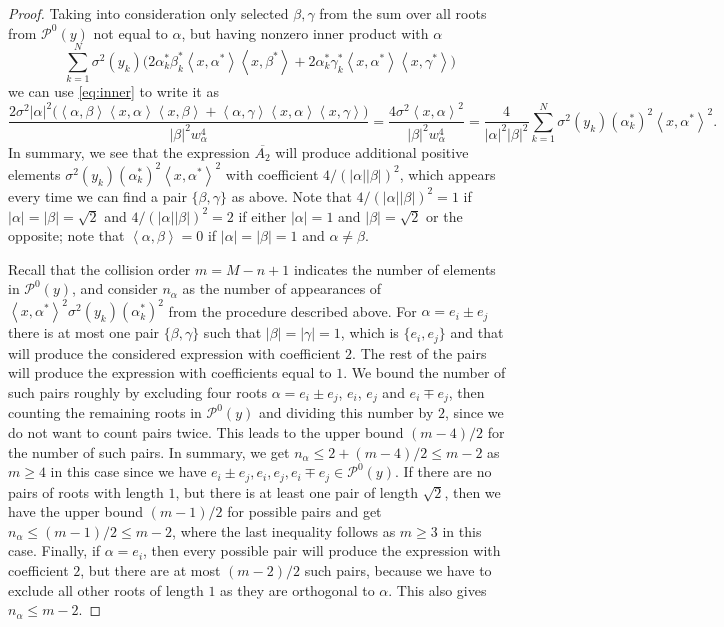 \documentclass{article}
\numberwithin{equation}{section}
\newcommand{\xa}{\left<x,\alpha\right>}
\newcommand{\xb}{\left<x,\beta\right>}
\newcommand{\xc}{\left<x,\gamma\right>}
\newcommand{\xas}{\left<x,\alpha^*\right>}
\newcommand{\xbs}{\left<x,\beta^*\right>}
\newcommand{\xcs}{\left<x,\gamma^*\right>}
\newcommand{\ab}{\left<\alpha,\beta\right>}
\newcommand{\ac}{\left<\alpha,\gamma\right>}
\newcommand{\Pzero}{\mathcal{P}^0(y)}
\theoremstyle{plain}
\begin{document}
\begin{proof}
Taking into consideration only selected $\beta,\gamma$ from the sum over all roots from $\Pzero$ not equal to $\alpha$, but having nonzero inner product with $\alpha$
\begin{equation*}
    \sum_{k=1}^N \sigma^2(y_k) \big(2\alpha_k^*\beta_k^* \xas\xbs+2\alpha_k^*\gamma_k^*\xas\xcs\big)
\end{equation*}
we can use \eqref{eq:inner} to write it as
\begin{equation*}
    \frac{2\sigma^2|\alpha|^2\big(\ab \xa\xb+	\ac \xa\xc\big)}{|\beta|^2 w_\alpha^4 } = \frac{4\sigma^2\xa^2}{|\beta|^2 w_\alpha^4} = \frac{4}{|\alpha|^2|\beta|^2 }\sum_{k=1}^N \sigma^2(y_k)(\alpha_k^*)^2 \xas^2.
\end{equation*}
In summary, we see that the expression $\overline{A_2}$ will produce additional positive elements $\sigma^2(y_k)(\alpha_k^*)^2\xas^2$ with coefficient $4/(|\alpha||\beta|)^2$, which appears every time we can find a pair $\{\beta,\gamma\}$ as above. Note that $4/(|\alpha||\beta|)^2=1$ if $|\alpha|=|\beta|=\sqrt{2}$ and $4/(|\alpha||\beta|)^2={2}$ {if either $|\alpha|=1$ and $|\beta|=\sqrt2$ or the opposite; note that $\ab=0$ if $|\alpha|=|\beta|=1$ and $\alpha\neq\beta$.}

Recall that the collision order $m=M-n+1$ indicates the number of elements in $\Pzero$, and consider $n_\alpha$ as the number of appearances of $\xas^2\sigma^2(y_k)(\alpha_k^*)^2$ from the procedure described above. For $\alpha = e_i\pm e_j$ there is at most one pair $\{\beta,\gamma\}$ such that $|\beta|=|\gamma|=1$, which is $\{e_i,e_j\}$ and that will produce the considered expression with coefficient $2$. The rest of the pairs will produce the expression with coefficients equal to $1$. We bound the number of such pairs roughly by excluding four roots $\alpha = e_i\pm e_j$, $e_i$, $e_j$ and $e_i\mp e_j$, then counting the remaining roots in $\Pzero$ and dividing this number by $2$, since we do not want to count pairs twice. This leads to the upper bound $(m-4)/2$ for the number of such pairs. In summary, we get $n_\alpha\leq 2+(m-4)/2\leq m-2$ as $m\geq 4$ in this case since we have $e_i\pm e_j, e_i, e_j, e_i\mp e_j \in \Pzero$. If there are no pairs of roots with length $1$, but there is at least one pair of length $\sqrt{2}$, then we have the upper bound $(m-1)/2$ for possible pairs and get $n_\alpha\leq (m-1)/2\leq m-2$, where the last inequality follows as $m\geq 3$ in this case. Finally, if $\alpha=e_i$, then every possible pair will produce the expression with coefficient $2$, but there are at most $(m-2)/2$ such pairs, because we have to exclude all other roots of length $1$ as they are orthogonal to $\alpha$. This also gives $n_\alpha\leq m-2$.


\end{proof}
\end{document}
